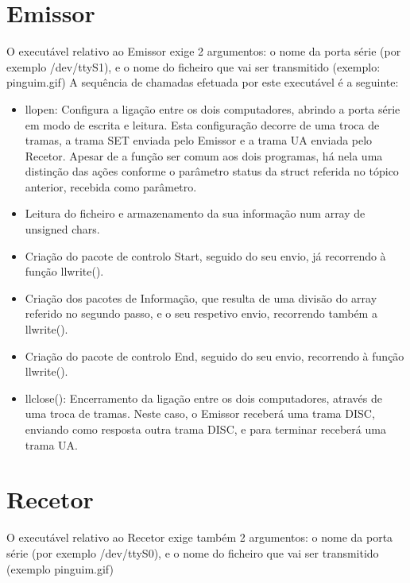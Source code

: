 \documentclass[article, a4paper, 11pt, oneside]{memoir}
\begin{document}
\section{Emissor}
O executável relativo ao Emissor exige 2 argumentos: o nome da porta série (por exemplo /dev/ttyS1), e o nome do ficheiro que vai ser transmitido (exemplo: pinguim.gif)
A sequência de chamadas efetuada por este executável é a seguinte:
\begin{itemize}
	\item llopen: Configura a ligação entre os dois computadores, abrindo a porta série em modo de escrita e leitura. Esta configuração decorre de uma troca de tramas, a trama SET enviada pelo Emissor e a trama UA enviada pelo Recetor. Apesar de a função ser comum aos dois programas, há nela uma distinção das ações conforme o parâmetro status da struct referida no tópico anterior, recebida como parâmetro.
	\item Leitura do ficheiro e armazenamento da sua informação num array de unsigned chars.
	\item Criação do pacote de controlo Start, seguido do seu envio, já recorrendo à função llwrite().
	\item Criação dos pacotes de Informação, que resulta de uma divisão do array referido no segundo passo, e o seu respetivo envio, recorrendo também a llwrite().
	\item Criação do pacote de controlo End, seguido do seu envio, recorrendo à função llwrite().
	\item llclose(): Encerramento da ligação entre os dois computadores, através de uma troca de tramas. Neste caso, o Emissor receberá uma trama DISC, enviando como resposta outra trama DISC, e para terminar receberá uma trama UA.
\end{itemize}

\section{Recetor}
O executável relativo ao Recetor exige também 2 argumentos: o nome da porta série (por exemplo /dev/ttyS0), e o nome do ficheiro que vai ser transmitido (exemplo pinguim.gif)
 
\end{document}
